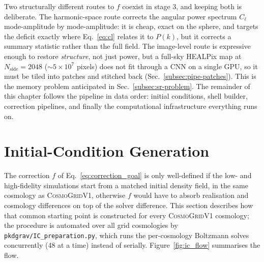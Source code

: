 \documentclass{report}
\begin{document}
Two structurally different routes to $f$ coexist in stage 3, and keeping both is deliberate. The harmonic-space route corrects the angular power spectrum $C_\ell$ mode-amplitude by mode-amplitude: it is cheap, exact on the sphere, and targets the deficit exactly where Eq.~\eqref{eq:cl} relates it to $P(k)$, but it corrects a summary statistic rather than the full field. The image-level route is expressive enough to restore \emph{structure}, not just power, but a full-sky HEALPix map at \mbox{$N_{\mathrm{side}}=2048$} (\mbox{$\sim 5\times10^7$} pixels) does not fit through a CNN on a single GPU, so it must be tiled into patches and stitched back (Sec.~\ref{subsec:pipe-patches}). This is the memory problem anticipated in Sec.~\ref{subsec:sr-problem}. The remainder of this chapter follows the pipeline in data order: initial conditions, shell builder, correction pipelines, and finally the computational infrastructure everything runs on.

\section{Initial-Condition Generation}
\label{sec:ic_generation}

The correction $f$ of Eq.~\eqref{eq:correction_goal} is only well-defined if the low- and high-fidelity simulations start from a matched initial density field, in the same cosmology as \textsc{CosmoGridV1}, otherwise $f$ would have to absorb realisation and cosmology differences on top of the solver difference. This section describes how that common starting point is constructed for every \textsc{CosmoGridV1} cosmology; the procedure is automated over all grid cosmologies by \texttt{pkdgrav/IC\_preparation.py}, which runs the per-cosmology Boltzmann solves concurrently (48 at a time) instead of serially. Figure~\ref{fig:ic_flow} summarises the flow.
\end{document}
